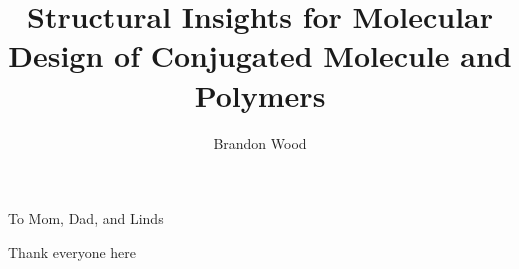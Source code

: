 \documentclass{ucbthesis}
\begin{document}

\title{Structural Insights for Molecular Design of Conjugated Molecule and Polymers}
\author{Brandon Wood}




\maketitle
\approvalpage
\copyrightpage



\begin{frontmatter}

\begin{dedication}
\null\vfil
\begin{center}
To Mom, Dad, and Linds\\\vspace{12pt}
\end{center}
\vfil\null
\end{dedication}


\tableofcontents
\clearpage
\listoffigures
\clearpage
\listoftables

\begin{acknowledgements}
Thank everyone here

\end{acknowledgements}

\end{frontmatter}
\end{document}
